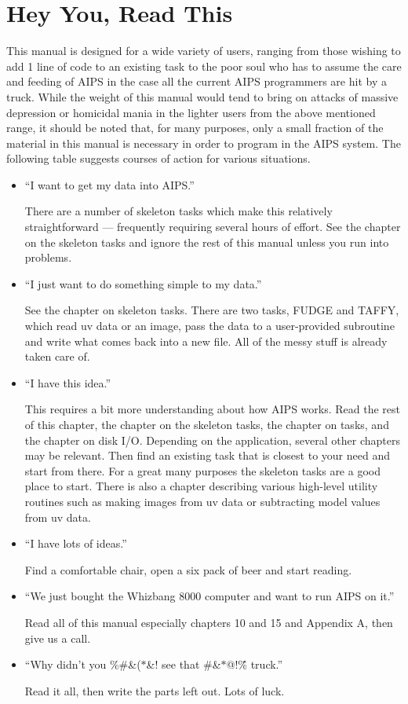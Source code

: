 \section{Hey You, Read This}
This manual is designed for a wide variety of users, ranging from
those wishing to add 1 line of code to an existing task to the poor
soul who has to assume the care and feeding of AIPS in the case all
the current AIPS programmers are hit by a truck.  While the weight of
this manual would tend to bring on attacks of massive depression or
homicidal mania in the lighter users from the above mentioned range,
it should be noted that, for many purposes, only a small fraction of
the material in this manual is necessary in order to program in the
AIPS system. The following table suggests courses of action for
various situations.
\begin{itemize} %
\item ``I want to get my data into AIPS.''

There are a number of skeleton tasks which make this relatively
straightforward --- frequently requiring several hours of effort.  See
the chapter on the skeleton tasks and ignore the rest of this manual
unless you run into problems.
\item ``I just want to do something simple to my data.''

See the chapter on skeleton tasks.  There are two tasks, FUDGE and
TAFFY, which read uv data or an image, pass the data to a
user-provided subroutine and write what comes back into a new file.
All of the messy stuff is already taken care of.
\item ``I have this idea.''

This requires a bit more understanding about how AIPS works. Read the
rest of this chapter, the chapter on the skeleton tasks, the chapter
on tasks, and the chapter on disk I/O.  Depending on the application,
several other chapters may be relevant.  Then find an existing task
that is closest to your need and start from there.  For a great many
purposes the skeleton tasks are a good place to start. There is also a
chapter describing various high-level utility routines such as making
images from uv data or subtracting model values from uv data.
\item ``I have lots of ideas.''

Find a comfortable chair, open a six pack of beer and start reading.
\item ``We just bought the Whizbang 8000 computer and want to run AIPS on
it.''

     Read all of this manual especially chapters 10 and 15 and Appendix
A, then give us a call.
\item ``Why didn't you \%\#\&($\ast$\&! see that \#\&$\ast$@!\^\% truck.''

     Read it all, then write the parts left out.  Lots of luck.
\end{itemize} %

